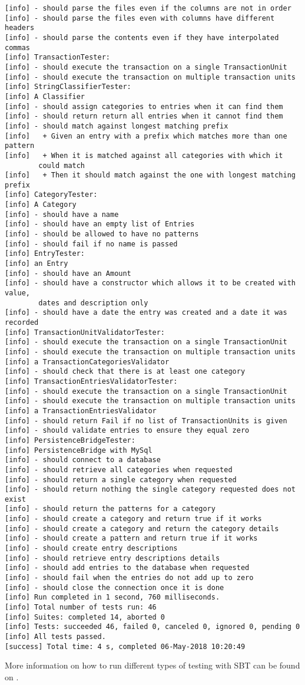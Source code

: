 \begin{lstlisting}
[info] - should parse the files even if the columns are not in order
[info] - should parse the files even with columns have different headers
[info] - should parse the contents even if they have interpolated commas
[info] TransactionTester:
[info] - should execute the transaction on a single TransactionUnit
[info] - should execute the transaction on multiple transaction units
[info] StringClassifierTester:
[info] A Classifier
[info] - should assign categories to entries when it can find them
[info] - should return return all entries when it cannot find them
[info] - should match against longest matching prefix
[info]   + Given an entry with a prefix which matches more than one pattern 
[info]   + When it is matched against all categories with which it
        could match 
[info]   + Then it should match against the one with longest matching prefix 
[info] CategoryTester:
[info] A Category
[info] - should have a name
[info] - should have an empty list of Entries
[info] - should be allowed to have no patterns
[info] - should fail if no name is passed
[info] EntryTester:
[info] an Entry
[info] - should have an Amount
[info] - should have a constructor which allows it to be created with value,
        dates and description only
[info] - should have a date the entry was created and a date it was recorded
[info] TransactionUnitValidatorTester:
[info] - should execute the transaction on a single TransactionUnit
[info] - should execute the transaction on multiple transaction units
[info] a TransactionCategoriesValidator
[info] - should check that there is at least one category
[info] TransactionEntriesValidatorTester:
[info] - should execute the transaction on a single TransactionUnit
[info] - should execute the transaction on multiple transaction units
[info] a TransactionEntriesValidator
[info] - should return Fail if no list of TransactionUnits is given
[info] - should validate entries to ensure they equal zero
[info] PersistenceBridgeTester:
[info] PersistenceBridge with MySql
[info] - should connect to a database
[info] - should retrieve all categories when requested
[info] - should return a single category when requested
[info] - should return nothing the single category requested does not exist
[info] - should return the patterns for a category
[info] - should create a category and return true if it works
[info] - should create a category and return the category details
[info] - should create a pattern and return true if it works
[info] - should create entry descriptions
[info] - should retrieve entry descriptions details
[info] - should add entries to the database when requested
[info] - should fail when the entries do not add up to zero
[info] - should close the connection once it is done
[info] Run completed in 1 second, 760 milliseconds.
[info] Total number of tests run: 46
[info] Suites: completed 14, aborted 0
[info] Tests: succeeded 46, failed 0, canceled 0, ignored 0, pending 0
[info] All tests passed.
[success] Total time: 4 s, completed 06-May-2018 10:20:49
\end{lstlisting}

More information on how to run different types of testing with SBT can be found
on \cite[][Ch.~2]{hinojosa2013testing}.
